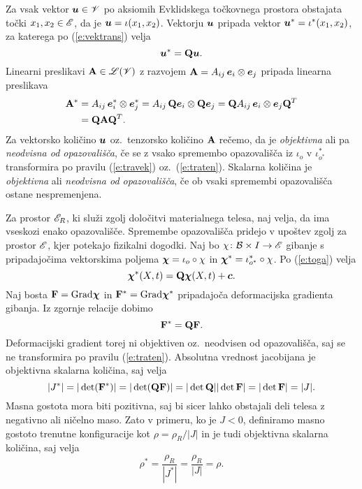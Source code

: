 Za vsak vektor $\boldsymbol u\in\mathscr V$ po aksiomih Evklidskega točkovnega prostora obstajata
točki $x_1,x_2\in\mathscr E$, da je $\boldsymbol u=\iota(x_1,x_2)$. Vektorju $\boldsymbol u$ pripada
vektor $\boldsymbol u^*=\iota^*(x_1,x_2)$, za katerega po (\ref{e:vektrans}) velja
\begin{equation} \label{e:travek}
	\boldsymbol u^*=\mathbf Q\boldsymbol u.
\end{equation}
Linearni preslikavi $\mathbf A\in\mathscr L(\mathscr V)$ z razvojem $\mathbf A=A_{ij}\,\boldsymbol e_i\otimes\boldsymbol e_j$
pripada linearna preslikava
\begin{align}
	\mathbf A^*&=A_{ij}\,\boldsymbol e^*_i\otimes\boldsymbol e^*_j=A_{ij}\,\mathbf Q\boldsymbol e_i\otimes\mathbf Q\boldsymbol e_j
	=\mathbf QA_{ij}\,\boldsymbol e_i\otimes\boldsymbol e_j\mathbf Q^T \nonumber \\
	&=\mathbf Q\mathbf A\mathbf Q^T. \label{e:traten}
\end{align}
Za vektorsko količino $\boldsymbol u$ oz.~tenzorsko količino $\mathbf A$
rečemo, da je \emph{objektivna} ali pa \emph{neodvisna od opazovališča},
če se z vsako spremembo opazovališča iz $\iota_o$ v $\iota^*_{o^*}$
transformira po pravilu (\ref{e:travek}) oz.~(\ref{e:traten}).
Skalarna količina je \emph{objektivna} ali \emph{neodvisna od opazovališča},
če ob vsaki spremembi opazovališča ostane nespremenjena.

Za prostor $\mathscr E_R$, ki služi zgolj določitvi materialnega telesa, naj velja,
da ima vseskozi enako opazovališče. Spremembe opazovališča pridejo v upoštev zgolj
za prostor $\mathscr E$, kjer potekajo fizikalni dogodki. Naj bo $\chi\colon\mathcal B\times I\to\mathscr E$
gibanje s pripadajočima vektorskima poljema $\boldsymbol \chi=\iota_o\circ\chi$ in
$\boldsymbol \chi^*=\iota^*_{o^*}\circ\chi$. Po (\ref{e:toga}) velja
\[
	\boldsymbol \chi^*(X,t)=\mathbf Q\boldsymbol \chi(X,t)+\boldsymbol c.
\]
Naj bosta $\mathbf F=\mathrm{Grad}\boldsymbol \chi$ in $\mathbf F^*=\mathrm{Grad}\boldsymbol \chi^*$ pripadajoča
deformacijska gradienta gibanja. Iz zgornje relacije dobimo
\[
	\mathbf F^*=\mathbf Q\mathbf F.
\]
Deformacijski gradient torej ni objektiven oz.~neodvisen od opazovališča, saj se ne
transformira po pravilu (\ref{e:traten}). Absolutna vrednost jacobijana je objektivna skalarna
količina, saj velja
\[
	|J^*|=|\det(\mathbf F^*)|=|\det(\mathbf Q\mathbf F)|=|\det\mathbf Q||\det\mathbf F|
	=|\det\mathbf F|=|J|.
\]
Masna gostota mora biti pozitivna, saj bi sicer lahko obstajali deli telesa
z negativno ali ničelno maso. Zato v primeru, ko je $J<0$, definiramo masno
gostoto trenutne konfiguracije kot $\rho=\rho_R/|J|$ in je tudi objektivna skalarna količina,
saj velja
\[ \rho^*=\frac{\rho_R}{|J^*|}=\frac{\rho_R}{|J|}=\rho. \]

